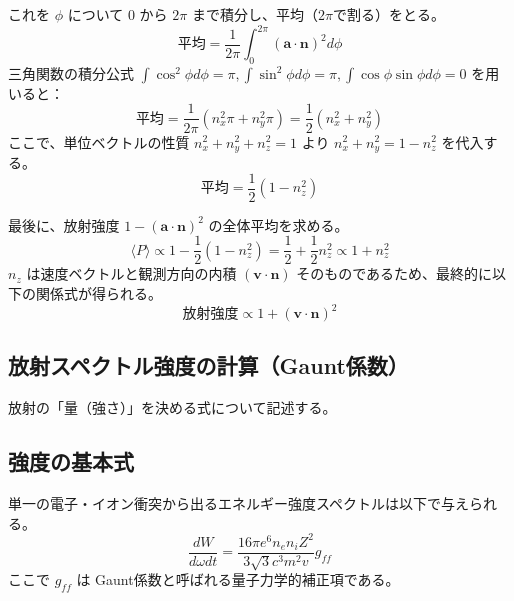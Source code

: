 \documentclass[a4paper,11pt]{bxjsarticle} %
\begin{document}
これを $\phi$ について $0$ から $2\pi$ まで積分し、平均（$2\pi$で割る）をとる。
\begin{equation}
    \text{平均} = \frac{1}{2\pi} \int_0^{2\pi} (\bm{a} \cdot \bm{n})^2 d\phi
\end{equation}
三角関数の積分公式 $\int \cos^2\phi d\phi = \pi, \int \sin^2\phi d\phi = \pi, \int \cos\phi\sin\phi d\phi = 0$ を用いると：
\begin{equation}
    \text{平均} = \frac{1}{2\pi} (n_x^2 \pi + n_y^2 \pi) = \frac{1}{2}(n_x^2 + n_y^2)
\end{equation}
ここで、単位ベクトルの性質 $n_x^2 + n_y^2 + n_z^2 = 1$ より $n_x^2 + n_y^2 = 1 - n_z^2$ を代入する。
\begin{equation}
    \text{平均} = \frac{1}{2}(1 - n_z^2)
\end{equation}

最後に、放射強度 $1 - (\bm{a} \cdot \bm{n})^2$ の全体平均を求める。
\begin{equation}
    \langle P \rangle \propto 1 - \frac{1}{2}(1 - n_z^2) = \frac{1}{2} + \frac{1}{2}n_z^2 \propto 1 + n_z^2
\end{equation}
$n_z$ は速度ベクトルと観測方向の内積 $(\bm{v} \cdot \bm{n})$ そのものであるため、最終的に以下の関係式が得られる。
\begin{equation}
    \text{放射強度} \propto 1 + (\bm{v} \cdot \bm{n})^2
\end{equation}

\subsection{放射スペクトル強度の計算（Gaunt係数）}

放射の「量（強さ）」を決める式について記述する。

\subsection{強度の基本式}
単一の電子・イオン衝突から出るエネルギー強度スペクトルは以下で与えられる。
\begin{equation}
    \frac{dW}{d\omega dt} = \frac{16\pi e^6 n_e n_i Z^2}{3\sqrt{3} c^3 m^2 v} g_{ff}
\end{equation}
ここで $g_{ff}$ は Gaunt係数と呼ばれる量子力学的補正項である。
\end{document}
